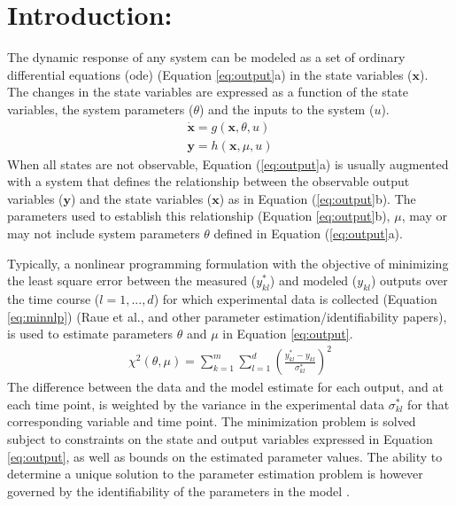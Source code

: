 \documentclass[10pt]{article}
\begin{document}
\section{Introduction:}	
The dynamic response of any system can be modeled as a set of ordinary differential equations (ode) (Equation \ref{eq:output}a) in the state variables ($\mathbf{x}$). The changes in the state variables are expressed as a function of the state variables, the system parameters ($\theta$) and the inputs to the system ($u$).	
\begin{subequations}\label{eq:output}
	\begin{align}
	\dot{\mathbf{x}} = g(\mathbf{x}, \theta, u)\\
	\mathbf{y} = h(\mathbf{x},\mu,u)
	\end{align}
\end{subequations}
When all states are not observable, Equation (\ref{eq:output}a) is usually augmented with a system that defines the relationship between the observable output variables ($\mathbf{y}$) and the state variables ($\mathbf{x}$) as in Equation (\ref{eq:output}b). The parameters used to establish this relationship (Equation \ref{eq:output}b), $\mu$, may or may not include system parameters $\theta$ defined in Equation (\ref{eq:output}a).

Typically, a nonlinear programming formulation with the objective of minimizing the least square error between the measured ($y_{kl}^*$) and modeled ($y_{kl}$) outputs over the time course ($l = {1, ..., d}$) for which experimental data is collected (Equation \ref{eq:minnlp}) (Raue et al., and other parameter estimation/identifiability papers), is used to estimate parameters $\theta$ and $\mu$ in Equation \ref{eq:output}.
\begin{align}\label{eq:minnlp}
\chi^2(\theta,\mu) = \sum_{k=1}^{m}\sum_{l=1}^{d}\left(\frac{y_{kl}^*-y_{kl}}{\sigma_{kl}^*}\right)^2
\end{align}
The difference between the data and the model estimate for each output, and at each time point, is weighted by the variance in the experimental data $\sigma_{kl}^*$ for that corresponding variable and time point.
The minimization problem is solved subject to constraints on the state and output variables expressed in Equation \ref{eq:output}, as well as bounds on the estimated parameter values. The ability to determine a unique solution to the parameter estimation problem is however governed by the identifiability of the parameters in the model \parencite{McLean2012}. 
\end{document}

